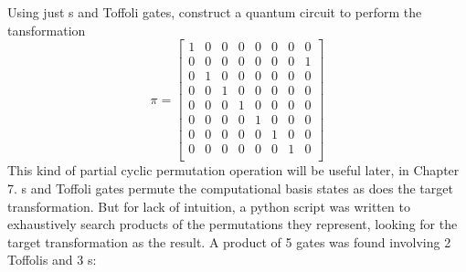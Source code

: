  Using just \CNOT s and Toffoli gates, construct a quantum circuit to perform the tansformation
$$\pi = \begin{bmatrix}
1 & 0 & 0 & 0 & 0 & 0 & 0 & 0 \\
0 & 0 & 0 & 0 & 0 & 0 & 0 & 1 \\
0 & 1 & 0 & 0 & 0 & 0 & 0 & 0 \\
0 & 0 & 1 & 0 & 0 & 0 & 0 & 0 \\
0 & 0 & 0 & 1 & 0 & 0 & 0 & 0 \\
0 & 0 & 0 & 0 & 1 & 0 & 0 & 0 \\
0 & 0 & 0 & 0 & 0 & 1 & 0 & 0 \\
0 & 0 & 0 & 0 & 0 & 0 & 1 & 0 \\
\end{bmatrix}$$
This kind of partial cyclic permutation operation will be useful later, in Chapter 7.
\Soln \CNOT s and Toffoli gates permute the computational basis states as does the target transformation. But for lack of intuition, a python script was written to exhaustively search products of the permutations they represent, looking for the target transformation as the result.  A product of 5 gates was found involving 2 Toffolis and 3 \CNOT s:
